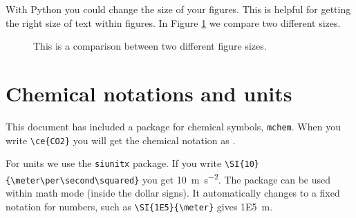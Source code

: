 With Python you could change the size of your figures. This is helpful for getting the right size of text within figures. In Figure \ref{fig:SizeDiff} we compare two different sizes.

\begin{figure}[H]
  \centering
  \quad
  \caption{This is a comparison between two different figure sizes.}
\label{fig:SizeDiff}
\end{figure}


\section{Chemical notations and units}

This document has included a package for chemical symbols, \texttt{mchem}. When you write \verb=\ce{CO2}= you will get the chemical notation as .

For units we use the \texttt{siunitx} package. If you write \verb=\SI{10}{\meter\per\second\squared}= you get \SI{10}{\meter\per\second\squared}. The package can be used within math mode (inside the dollar signs). It automatically changes to a fixed notation for numbers, such as \verb=\SI{1E5}{\meter}= gives \SI{1E5}{\meter}.

